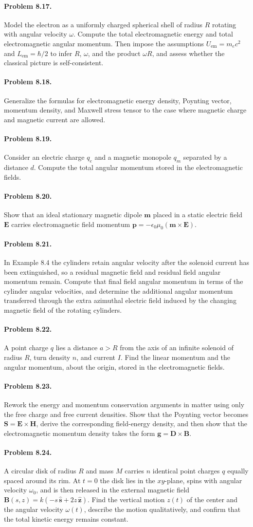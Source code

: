 \documentclass{aa}
\newcommand{\problemstatement}[2]{%
\paragraph{Problem #1.}#2\par\medskip
}
\begin{document}
\problemstatement{8.17}{Model the electron as a uniformly charged spherical shell of radius \(R\) rotating with angular velocity \(\omega\). Compute the total electromagnetic energy and total electromagnetic angular momentum. Then impose the assumptions \(U_{\mathrm{em}}=m_ec^2\) and \(L_{\mathrm{em}}=\hbar/2\) to infer \(R\), \(\omega\), and the product \(\omega R\), and assess whether the classical picture is self-consistent.}
\problemstatement{8.18}{Generalize the formulas for electromagnetic energy density, Poynting vector, momentum density, and Maxwell stress tensor to the case where magnetic charge and magnetic current are allowed.}
\problemstatement{8.19}{Consider an electric charge \(q_e\) and a magnetic monopole \(q_m\) separated by a distance \(d\). Compute the total angular momentum stored in the electromagnetic fields.}
\problemstatement{8.20}{Show that an ideal stationary magnetic dipole \(\mathbf m\) placed in a static electric field \(\mathbf E\) carries electromagnetic field momentum \( \mathbf p=-\epsilon_0\mu_0(\mathbf m\times \mathbf E)\).}
\problemstatement{8.21}{In Example 8.4 the cylinders retain angular velocity after the solenoid current has been extinguished, so a residual magnetic field and residual field angular momentum remain. Compute that final field angular momentum in terms of the cylinder angular velocities, and determine the additional angular momentum transferred through the extra azimuthal electric field induced by the changing magnetic field of the rotating cylinders.}
\problemstatement{8.22}{A point charge \(q\) lies a distance \(a>R\) from the axis of an infinite solenoid of radius \(R\), turn density \(n\), and current \(I\). Find the linear momentum and the angular momentum, about the origin, stored in the electromagnetic fields.}
\problemstatement{8.23}{Rework the energy and momentum conservation arguments in matter using only the free charge and free current densities. Show that the Poynting vector becomes \( \mathbf S=\mathbf E\times \mathbf H\), derive the corresponding field-energy density, and then show that the electromagnetic momentum density takes the form \( \mathbf g=\mathbf D\times \mathbf B\).}
\problemstatement{8.24}{A circular disk of radius \(R\) and mass \(M\) carries \(n\) identical point charges \(q\) equally spaced around its rim. At \(t=0\) the disk lies in the \(xy\)-plane, spins with angular velocity \(\omega_0\), and is then released in the external magnetic field \( \mathbf B(s,z)=k(-s\,\hat{\mathbf s}+2z\,\hat{\mathbf z})\). Find the vertical motion \(z(t)\) of the center and the angular velocity \(\omega(t)\), describe the motion qualitatively, and confirm that the total kinetic energy remains constant.}
\end{document}
